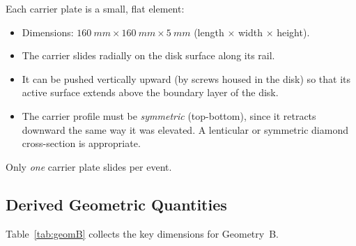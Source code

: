 \documentclass[11pt,a4paper]{article}
\begin{document}
Each carrier plate is a small, flat element:
\begin{itemize}
  \item Dimensions: $\SI{160}{mm} \times \SI{160}{mm}
        \times \SI{5}{mm}$ (length $\times$ width $\times$ height).
  \item The carrier slides radially on the disk surface along its rail.
  \item It can be pushed vertically upward (by screws housed in the
        disk) so that its active surface extends above the boundary
        layer of the disk.
  \item The carrier profile must be \emph{symmetric} (top-bottom),
        since it retracts downward the same way it was elevated. A
        lenticular or symmetric diamond cross-section is appropriate.
\end{itemize}

Only \emph{one} carrier plate slides per event.

\subsection{Derived Geometric Quantities}

Table~\ref{tab:geomB} collects the key dimensions for Geometry~B.
\end{document}
